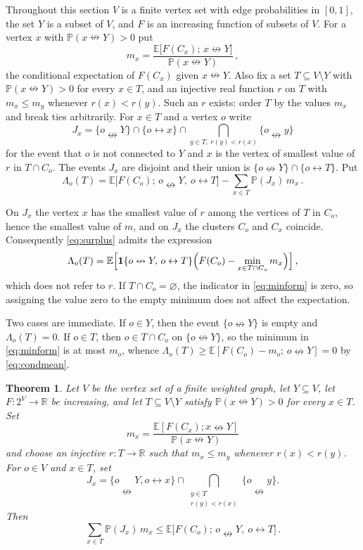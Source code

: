 \documentclass[11pt]{article}
\newtheorem{theorem}{Theorem}[section]
\theoremstyle{definition}
\theoremstyle{remark}
\newcommand{\PP}{\mathbb P}
\newcommand{\EE}{\mathbb E}
\newcommand{\one}{\mathbf 1}
\newcommand{\con}{\leftrightarrow}
\newcommand{\ncon}{\nleftrightarrow}
\begin{document}
Throughout this section $V$ is a finite vertex set with edge probabilities in $[0,1]$, the set
$Y$ is a subset of $V$, and $F$ is an increasing function of subsets of $V$. For a vertex
$x$ with $\PP(x\ncon Y)>0$ put
\begin{equation}\label{eq:condmean}
 m_x=\frac{\EE\bigl[F(C_x);\,x\ncon Y\bigr]}{\PP(x\ncon Y)}\,,
\end{equation}
the conditional expectation of $F(C_x)$ given $x\ncon Y$. Also fix a set $T\subseteq V\setminus Y$
with $\PP(x\ncon Y)>0$ for every $x\in T$, and an injective real function $r$ on $T$ with
$m_x\le m_y$ whenever $r(x)<r(y)$. Such an $r$ exists: order $T$ by the values $m_x$ and
break ties arbitrarily. For $x\in T$ and a vertex $o$ write
\begin{equation}\label{eq:pattern}
 J_x=\{o\ncon Y\}\cap\{o\con x\}\cap\bigcap_{y\in T,\ r(y)<r(x)}\{o\ncon y\}
\end{equation}
for the event that $o$ is not connected to $Y$ and $x$ is the vertex of smallest value of
$r$ in $T\cap C_o$. The events $J_x$ are disjoint and their union is
$\{o\ncon Y\}\cap\{o\con T\}$. Put
\begin{equation}\label{eq:surplus}
 \Lambda_o(T)=\EE\bigl[F(C_o);\,o\ncon Y,\ o\con T\bigr]-\sum_{x\in T}\PP(J_x)\,m_x\,.
\end{equation}

On $J_x$ the vertex $x$ has the smallest value of $r$ among the vertices of $T$ in $C_o$,
hence the smallest value of $m$, and on $J_x$ the clusters $C_o$ and $C_x$ coincide.
Consequently \eqref{eq:surplus} admits the expression
\begin{equation}\label{eq:minform}
 \Lambda_o(T)=\EE\Bigl[\one\{o\ncon Y,\,o\con T\}\Bigl(F(C_o)-\min_{x\in T\cap C_o}
 m_x\Bigr)\Bigr]\,,
\end{equation}
which does not refer to $r$. If $T\cap C_o=\varnothing$, the indicator in
\eqref{eq:minform} is zero, so assigning the value zero to the empty minimum does not
affect the expectation.

Two cases are immediate. If $o\in Y$, then the event $\{o\ncon Y\}$ is
empty and $\Lambda_o(T)=0$. If $o\in T$, then $o\in T\cap C_o$ on $\{o\ncon Y\}$, so the
minimum in \eqref{eq:minform} is at most $m_o$, whence
$\Lambda_o(T)\ge\EE[F(C_o)-m_o;\,o\ncon Y]=0$ by \eqref{eq:condmean}.

\begin{theorem}\label{thm:gen}
Let $V$ be the vertex set of a finite weighted graph, let $Y\subseteq V$, let
$F:2^V\to\mathbb R$ be
increasing, and let $T\subseteq V\setminus Y$ satisfy $\PP(x\ncon Y)>0$ for every $x\in T$.
Set
\[
 m_x=\frac{\EE[F(C_x);x\ncon Y]}{\PP(x\ncon Y)}
\]
and choose an injective $r:T\to\mathbb R$ such that $m_x\leq m_y$ whenever
$r(x)<r(y)$. For $o\in V$ and $x\in T$, set
\[
 J_x=\{o\ncon Y,o\con x\}\cap
      \bigcap_{\substack{y\in T\\r(y)<r(x)}}\{o\ncon y\}.
\]
Then
\[
 \sum_{x\in T}\PP(J_x)\,m_x\leq \EE\bigl[F(C_o);\,o\ncon Y,\ o\con T\bigr]\,.
\]
\end{theorem}
\end{document}
